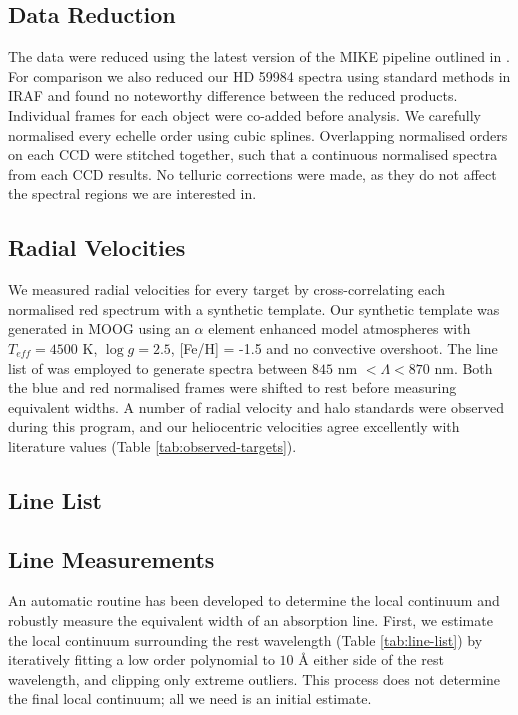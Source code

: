 \documentclass{emulateapj}
\begin{document}


\subsection{Data Reduction}

The data were reduced using the latest version of the MIKE pipeline outlined in \citet{Kelson;2003}. For comparison we also reduced our HD 59984 spectra using standard methods in \textsc{IRAF} and found no noteworthy difference between the reduced products. Individual frames for each object were co-added before analysis. We carefully normalised every echelle order using cubic splines. Overlapping normalised orders on each CCD were stitched together, such that a continuous normalised spectra from each CCD results. No telluric corrections were made, as they do not affect the spectral regions we are interested in.

\subsection{Radial Velocities}

We measured radial velocities for every target by cross-correlating each normalised red  spectrum with a synthetic template. Our synthetic template was generated in \textsc{MOOG} using an $\alpha$ element enhanced \citet{Castelli-Kurucz;2004} model atmospheres with $T_{eff} = 4500$ K, $\log{g} = 2.5$, [Fe/H] = -1.5 and no convective overshoot. The line list of \citet{Kirby;et-al_2008} was employed to generate spectra between $845$ nm $< \Lambda < 870$ nm. Both the blue and red normalised frames were shifted to rest before measuring equivalent widths. A number of radial velocity and halo standards were observed during this program, and our heliocentric velocities agree excellently with literature values (Table \ref{tab:observed-targets}).

\subsection{Line List}
\label{sec:line-list}



\subsection{Line Measurements}
An automatic routine has been developed to determine the local continuum and robustly measure the equivalent width of an absorption line. First, we estimate the local continuum surrounding the rest wavelength (Table \ref{tab:line-list}) by iteratively fitting a low order polynomial to $10$ \AA{} either side of the rest wavelength, and clipping only extreme outliers. This process does not determine the final local continuum; all we need is an initial estimate.
\end{document}
